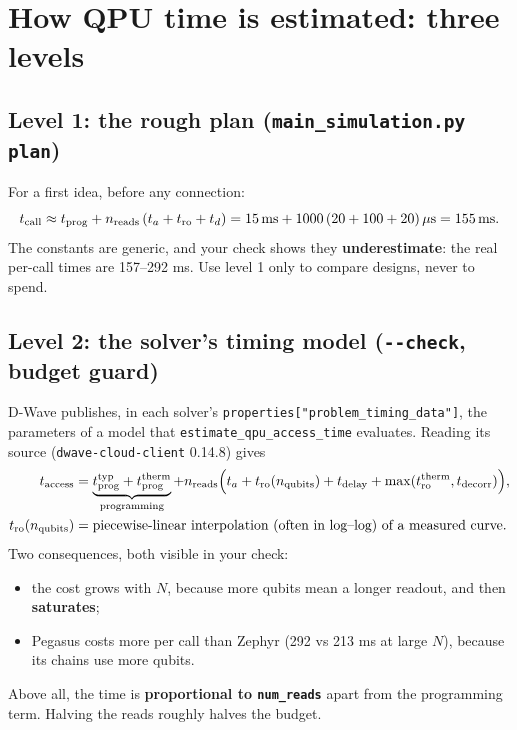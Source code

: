 \documentclass[11pt,a4paper]{article}
\newcommand{\code}[1]{\nolinkurl{#1}}
\begin{document}
\section{How QPU time is estimated: three levels}\label{sec:estimate}
\subsection{Level 1: the rough plan (\texorpdfstring{\code{main_simulation.py plan}}{main simulation.py plan})}
For a first idea, before any connection:
\begin{equation}
t_{\rm call}\approx t_{\rm prog}+n_{\rm reads}\,(t_a+t_{\rm ro}+t_d)=15\,{\rm ms}+1000\,(20+100+20)\,\mu{\rm s}=155\,{\rm ms}.
\end{equation}
The constants are generic, and your check shows they \textbf{underestimate}: the real per-call times are 157--292 ms.
Use level 1 only to compare designs, never to spend.

\subsection{Level 2: the solver's timing model (\texorpdfstring{\code{--check}}{--check}, budget guard)}
D-Wave publishes, in each solver's \code{properties["problem_timing_data"]}, the parameters of a model that
\code{estimate_qpu_access_time} evaluates. Reading its source (\code{dwave-cloud-client} 0.14.8) gives
\begin{align}
t_{\rm access}&=\underbrace{t_{\rm prog}^{\rm typ}+t_{\rm prog}^{\rm therm}}_{\text{programming}}
+n_{\rm reads}\Big(t_a+t_{\rm ro}(n_{\rm qubits})+t_{\rm delay}+\max(t_{\rm ro}^{\rm therm},t_{\rm decorr})\Big),\\
t_{\rm ro}(n_{\rm qubits})&=\text{piecewise-linear interpolation (often in log--log) of a measured curve}.
\end{align}
Two consequences, both visible in your check:
\begin{itemize}
\item the cost grows with $N$, because more qubits mean a longer readout, and then \textbf{saturates};
\item Pegasus costs more per call than Zephyr (292 vs 213 ms at large $N$), because its chains use more qubits.
\end{itemize}
Above all, the time is \textbf{proportional to \code{num_reads}} apart from the programming term. Halving the reads roughly halves the budget.
\end{document}
